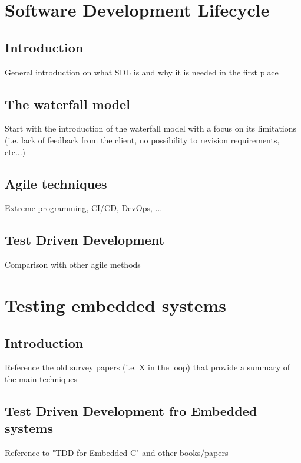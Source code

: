 \section{Software Development Lifecycle}
\subsection{Introduction}
General introduction on what SDL is and why it is needed in the first place

\subsection{The waterfall model}
Start with the introduction of the waterfall model with a focus on its limitations (i.e. lack of feedback from the client, no possibility to revision requirements, etc...)


\subsection{Agile techniques}
Extreme programming, CI/CD, DevOps, ...


\subsection{Test Driven Development}
Comparison with other agile methods




\section{Testing embedded systems}
\subsection{Introduction}
Reference the old survey papers (i.e. X in the loop) that provide a summary of the main techniques


\subsection{Test Driven Development fro Embedded systems}
Reference to "TDD for Embedded C" and other books/papers

